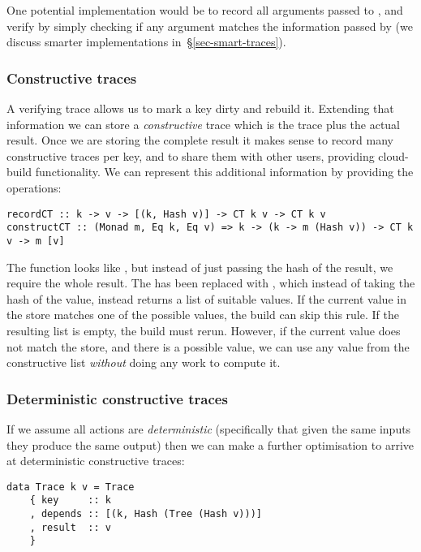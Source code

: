 One potential implementation would be to record all arguments passed to , and verify by simply checking if any argument matches the information passed by  (we discuss smarter implementations in~\S\ref{sec-smart-traces}).

\subsubsection{Constructive traces}\label{sec-constructive-traces}

A verifying trace allows us to mark a key dirty and rebuild it. Extending that information we can store a \emph{constructive} trace which is the trace plus the actual result. Once we are storing the complete result it makes sense to record many constructive traces per key, and to share them with other users, providing cloud-build functionality. We can represent this additional information by providing the operations:

\begin{verbatim}
recordCT :: k -> v -> [(k, Hash v)] -> CT k v -> CT k v
constructCT :: (Monad m, Eq k, Eq v) => k -> (k -> m (Hash v)) -> CT k v -> m [v]
\end{verbatim}

The function  looks like , but instead of just passing the hash of the result, we require the whole result. The  has been replaced with , which instead of taking the hash of the value, instead returns a list of suitable values. If the current value in the store matches one of the possible values, the build can skip this rule. If the resulting list is empty, the build must rerun. However, if the current value does not match the store, and there is a possible value, we can use any value from the constructive list \emph{without} doing any work to compute it.

\subsubsection{Deterministic constructive traces}\label{sec-deterministic-constructive-traces}

If we assume all actions are \emph{deterministic} (specifically that given the same inputs they produce the same output) then we can make a further optimisation to arrive at deterministic constructive traces:

\begin{verbatim}
data Trace k v = Trace
    { key     :: k
    , depends :: [(k, Hash (Tree (Hash v)))]
    , result  :: v
    }
\end{verbatim}

